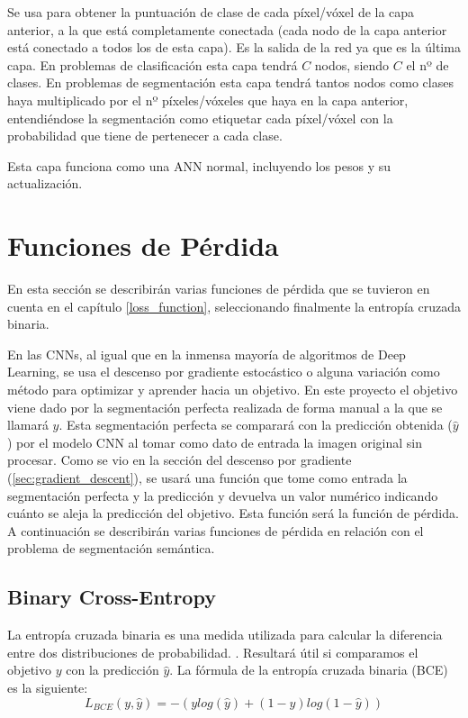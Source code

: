 Se usa para obtener la puntuación de clase de cada píxel/vóxel de la capa anterior, a la que está completamente conectada (cada nodo de la capa anterior está conectado a todos los de esta capa). Es la salida de la red ya que es la última capa. En problemas de clasificación esta capa tendrá $C$ nodos, siendo $C$ el nº de clases. En problemas de segmentación esta capa tendrá tantos nodos como clases haya multiplicado por el nº píxeles/vóxeles que haya en la capa anterior, entendiéndose la segmentación como etiquetar cada píxel/vóxel con la probabilidad que tiene de pertenecer a cada clase.

Esta capa funciona como una ANN normal, incluyendo los pesos y su actualización.

\section{Funciones de Pérdida}\label{cnn_loss_func}

En esta sección se describirán varias funciones de pérdida que se tuvieron en cuenta en el capítulo \ref{loss_function}, seleccionando finalmente la entropía cruzada binaria.

En las CNNs, al igual que en la inmensa mayoría de algoritmos de Deep Learning, se usa el descenso por gradiente estocástico o alguna variación como método para optimizar y aprender hacia un objetivo. En este proyecto el objetivo viene dado por la segmentación perfecta realizada de forma manual a la que se llamará $y$. Esta segmentación perfecta se comparará con la predicción obtenida ($\hat{y}$) por el modelo CNN al tomar como dato de entrada la imagen original sin procesar. Como se vio en la sección del descenso por gradiente (\ref{sec:gradient_descent}), se usará una función que tome como entrada la segmentación perfecta y la predicción y devuelva un valor numérico indicando cuánto se aleja la predicción del objetivo. Esta función será la función de pérdida. A continuación se describirán varias funciones de pérdida en relación con el problema de segmentación semántica.

\subsection{Binary Cross-Entropy}\label{cnn_bce}

La entropía cruzada binaria es una medida utilizada para calcular la diferencia entre dos distribuciones de probabilidad. \cite{Jadon2020}. Resultará útil si comparamos el objetivo $y$ con la predicción $\hat{y}$. La fórmula de la entropía cruzada binaria (BCE) es la siguiente:
\begin{equation}
L_{BCE}(y,\hat{y})=-(y log(\hat{y}) + (1-y)log(1-\hat{y}))
\end{equation}

